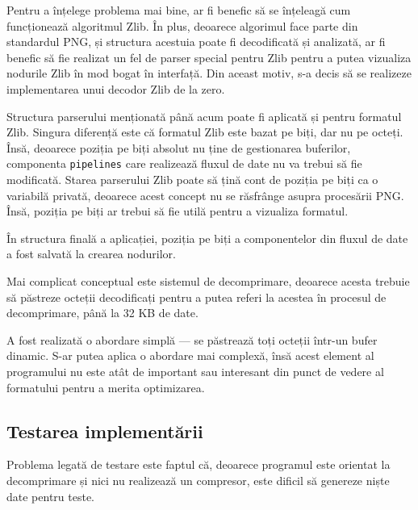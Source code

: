 \documentclass[a4paper,12pt]{report}
\begin{document}
Pentru a înțelege problema mai bine, ar fi benefic să se înțeleagă cum funcționează algoritmul Zlib.
În plus, deoarece algorimul face parte din standardul \ac{PNG},
și structura acestuia poate fi decodificată și analizată,
ar fi benefic să fie realizat un fel de parser special pentru Zlib pentru a putea vizualiza nodurile Zlib
în mod bogat în interfață.
Din aceast motiv, s-a decis să se realizeze implementarea unui decodor Zlib de la zero.

Structura parserului menționată până acum poate fi aplicată și pentru formatul Zlib.
Singura diferență este că formatul Zlib este bazat pe biți, dar nu pe octeți.
Însă, deoarece poziția pe biți absolut nu ține de gestionarea buferilor,
componenta \texttt{pipelines} care realizează fluxul de date nu va trebui să fie modificată.
Starea parserului Zlib poate să țină cont de poziția pe biți ca o variabilă privată, deoarece
acest concept nu se răsfrânge asupra procesării \ac{PNG}.
Însă, poziția pe biți ar trebui să fie utilă pentru a vizualiza formatul.

În structura finală a aplicației, poziția pe biți a componentelor din fluxul de date a fost salvată la crearea nodurilor.

Mai complicat conceptual este sistemul de decomprimare,
deoarece acesta trebuie să păstreze octeții decodificați pentru a putea referi la acestea
în procesul de decomprimare, până la 32 KB de date.

A fost realizată o abordare simplă --- se păstrează toți octeții într-un bufer dinamic.
S-ar putea aplica o abordare mai complexă, însă acest element al programului
nu este atât de important sau interesant din punct de vedere al formatului pentru a merita optimizarea.

\subsection{Testarea implementării}

Problema legată de testare este faptul că, deoarece programul este orientat
la decomprimare și nici nu realizează un compresor,
este dificil să genereze niște date pentru teste.
\end{document}
